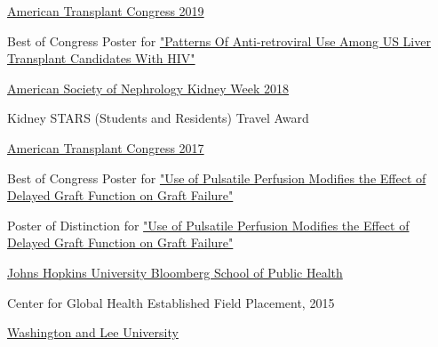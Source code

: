 \documentclass[10pt]{article}
\newcommand{\halfblankline}{\quad\vspace{-0.5\baselineskip}\pagebreak[3]}
\begin{document}
\halfblankline

\href{http://atcmeeting.org/}{American Transplant Congress 2019}
\begin{innerlist}
\item Best of Congress Poster for
  \href{https://atcmeetingabstracts.com/abstract/patterns-of-anti-retroviral-use-among-u-s-liver-transplant-candidates-with-hiv/}
  {"Patterns Of Anti-retroviral Use Among US Liver Transplant Candidates With HIV"}
\end{innerlist}

\halfblankline

\href{https://www.asn-online.org/education/kidneyweek/}{American Society of Nephrology Kidney Week 2018}
\begin{innerlist}
\item Kidney STARS (Students and Residents) Travel Award
\end{innerlist}

\halfblankline

\href{http://atcmeeting.org/}{American Transplant Congress 2017}
\begin{innerlist}
\item Best of Congress Poster for
  \href{http://atcmeetingabstracts.com/abstract/use-of-pulsatile-perfusion-modifies-the-effect-of-delayed-graft-function-on-graft-failure/}
  {"Use of Pulsatile Perfusion Modifies the Effect of Delayed Graft Function on Graft Failure"}
\item Poster of Distinction for
  \href{http://atcmeetingabstracts.com/abstract/use-of-pulsatile-perfusion-modifies-the-effect-of-delayed-graft-function-on-graft-failure/}
  {"Use of Pulsatile Perfusion Modifies the Effect of Delayed Graft Function on Graft Failure"}
\end{innerlist}

\halfblankline

\href{http://www.jhsph.edu/}{Johns Hopkins University Bloomberg School of Public Health}
\begin{innerlist}
\item Center for Global Health Established Field Placement, 2015

\halfblankline

\end{innerlist}

\href{https://www.wlu.edu/}{Washington and Lee University}
\end{document}
